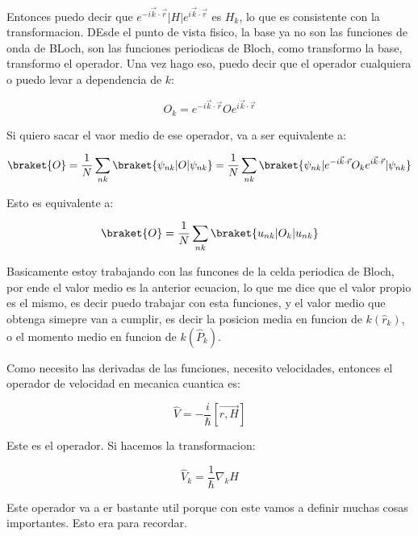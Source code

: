 \documentclass[11pt,fleqn]{book}
\begin{document}
Entonces puedo decir que $e^{-i\vec{k}\cdot\vec{r}}|H|e^{i\vec{k}\cdot\vec{r}}$ es $H_{k}$, lo que es consistente con la transformacion. DEsde el punto de vista fisico, la base ya no son las funciones de onda de BLoch, son las funciones periodicas de Bloch, como transformo la base, transformo el operador. Una vez hago eso, puedo decir que el operador cualquiera o puedo levar a dependencia de $k$:

\begin{equation}
    O_{k}=e^{-i\vec{k}\cdot\vec{r}}Oe^{i\vec{k}\cdot\vec{r}}
\end{equation}

Si quiero sacar el vaor medio de ese operador, va a ser equivalente a:

\begin{equation}
    \braket{O}=\frac{1}{N}\sum_{nk}\braket{\psi_{nk}|O|\psi_{nk}}=\frac{1}{N}\sum_{nk}\braket{\psi_{nk}|e^{-i\vec{k}\cdot\vec{r}}O_{k}e^{i\vec{k}\cdot\vec{r}}|\psi_{nk}}
\end{equation}

Esto es equivalente a:

\begin{equation}
    \braket{O}=\frac{1}{N}\sum_{nk}\braket{u_{nk}|O_{k}|u_{nk}}
\end{equation}

Basicamente estoy trabajando con las funcones de la celda periodica de Bloch, por ende el valor medio es la anterior ecuacion, lo que me dice que el valor propio es el mismo, es decir puedo trabajar con esta funciones, y el valor medio que obtenga simepre van a cumplir, es decir la posicion media en funcion de $k (\hat{r}_{k})$, o el momento medio en funcion de $k  (\hat{P}_{k})$.

Como necesito las derivadas de las funciones, necesito velocidades, entonces el operador de velocidad en mecanica cuantica es:

\begin{equation}
    \hat{V}=-\frac{i}{\hbar}\left[\vec{r,H}\right]
\end{equation}

Este es el operador. Si hacemos la transformacion:

\begin{equation}
    \hat{V}_{k}=\frac{1}{\hbar}\nabla_{k}H
\end{equation}

Este operador va a er bastante util porque con este vamos a definir muchas cosas importantes. Esto era para recordar.
\end{document}
